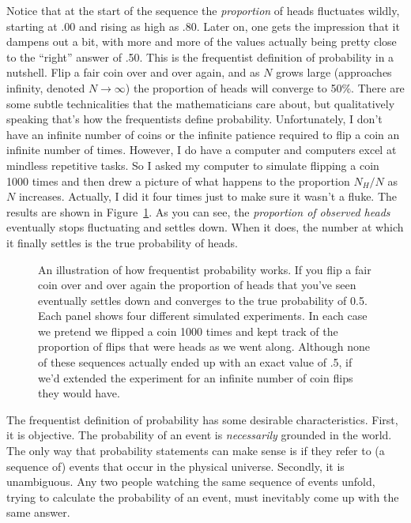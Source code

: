 Notice that at the start of the sequence the {\it proportion} of heads fluctuates wildly, starting at .00 and rising as high as .80. Later on, one gets the impression that it dampens out a bit, with more and more of the values actually being pretty close to the ``right'' answer of .50. This is the frequentist definition of probability in a nutshell. Flip a fair coin over and over again, and as $N$ grows large (approaches infinity, denoted $N\rightarrow \infty$) the proportion of heads will converge to 50\%. There are some subtle technicalities that the mathematicians care about, but qualitatively speaking that's how the frequentists define probability. Unfortunately, I don't have an infinite number of coins or the infinite patience required to flip a coin an infinite number of times. However, I do have a computer and computers excel at mindless repetitive tasks. So I asked my computer to simulate flipping a coin 1000 times and then drew a picture of what happens to the proportion $N_H / N$ as $N$ increases. Actually, I did it four times just to make sure it wasn't a fluke. The results are shown in Figure~\ref{fig:frequentistprobability}. As you can see, the {\it proportion of observed heads} eventually stops fluctuating and settles down. When it does, the number at which it finally settles is the true probability of heads.

\begin{figure}[p]
\begin{center}
\caption{An illustration of how frequentist probability works. If you flip a fair coin over and over again the proportion of heads that you've seen eventually settles down and converges to the true probability of 0.5. Each panel shows four different simulated experiments. In each case we pretend we flipped a coin 1000 times and kept track of the proportion of flips that were heads as we went along. Although none of these sequences actually ended up with an exact value of .5, if we'd extended the experiment for an infinite number of coin flips they would have.}
\label{fig:frequentistprobability}
\HR
\end{center}
\end{figure}

The frequentist definition of probability has some desirable characteristics. First, it is objective. The probability of an event is {\it necessarily} grounded in the world. The only way that probability statements can make sense is if they refer to (a sequence of) events that occur in the physical universe. Secondly, it is unambiguous. Any two people watching the same sequence of events unfold, trying to calculate the probability of an event, must inevitably come up with the same answer. 

